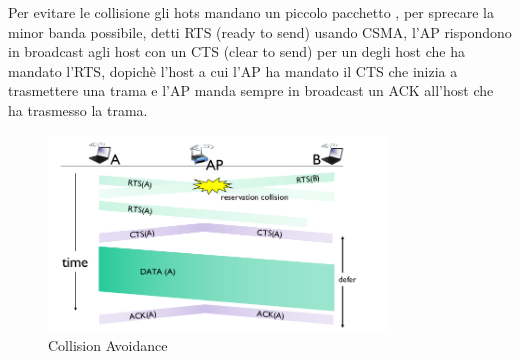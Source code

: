 \documentclass[12pt]{article}
\begin{document}
Per evitare le collisione gli hots mandano un piccolo pacchetto , per sprecare la minor banda possibile, detti RTS (ready to send) usando CSMA, l'AP rispondono in broadcast agli host con un CTS (clear to send) per un degli host che ha mandato l'RTS, dopich\`e l'host a cui l'AP ha mandato il CTS che inizia a trasmettere una trama e l'AP manda sempre in broadcast un ACK all'host che ha trasmesso la trama.
\begin{figure}[H]
    \centering
    \includegraphics[width=0.8\textwidth]{collision-avoidance.png}
    \caption{Collision Avoidance}
    \label{fig:collision-avoidance}
\end{figure}
\end{document}
